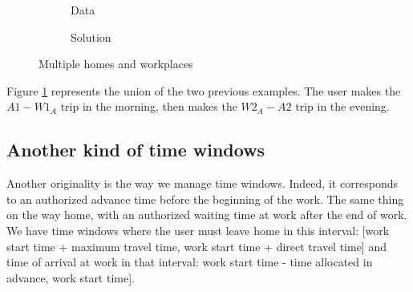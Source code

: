 \documentclass[12pt, a4paper,twoside]{memoir}
\begin{document}
	\begin{figure}[H]
		\centering
		\begin{subfigure}{.5\textwidth}
			\centering
			\caption{ Data }
		\end{subfigure}%
		\begin{subfigure}{.5\textwidth}
			\centering
			\caption{ Solution }
		\end{subfigure}
		\caption{Multiple homes and workplaces}
		\label{fig:Several homes and workplaces}
	\end{figure}
	
	Figure \ref{fig:Several homes and workplaces} represents the union of the two previous examples. The user makes the $A1-W1_A$ trip in the morning, then makes the $W2_A-A2$ trip in the evening.

	\subsection*{Another kind of time windows}
	
	Another originality is the way we manage time windows. Indeed, it corresponds to an authorized advance time before the beginning of the work. The same thing on the way home, with an authorized waiting time at work after the end of work. \newline
	We have time windows where the user must leave home in this interval: \newline
	{[work start time + maximum travel time, work start time + direct travel time]} \newline
	and time of arrival at work in that interval: \newline
	{work start time - time allocated in advance, work start time]}.
	
\end{document}

